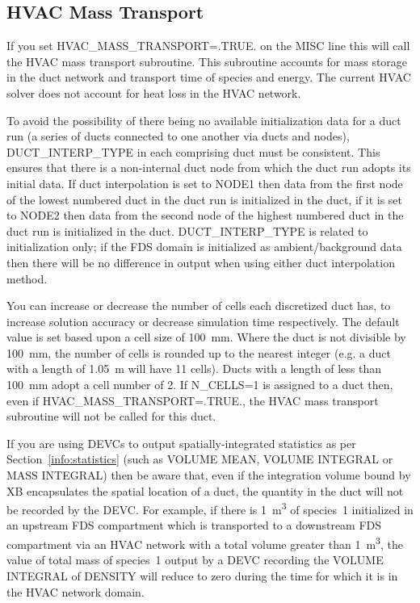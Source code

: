 \documentclass[11pt]{book}
\begin{document}
\subsection{HVAC Mass Transport}
\label{info:hvacmasstransport}

If you set {\ct HVAC\_MASS\_TRANSPORT=.TRUE.} on the {\ct MISC} line this will call the HVAC mass transport subroutine. This subroutine accounts for mass storage in the duct network and transport time of species and energy. The current HVAC solver does not account for heat loss in the HVAC network.

To avoid the possibility of there being no available initialization data for a duct run (a series of ducts connected to one another via ducts and nodes), {\ct DUCT\_INTERP\_TYPE} in each comprising duct must be consistent. This ensures that there is a non-internal duct node from which the duct run adopts its initial data. If duct interpolation is set to {\ct NODE1} then data from the first node of the lowest numbered duct in the duct run is initialized in the duct, if it is set to {\ct NODE2} then data from the second node of the highest numbered duct in the duct run is initialized in the duct. {\ct DUCT\_INTERP\_TYPE} is related to initialization only; if the FDS domain is initialized as ambient/background data then there will be no difference in output when using either duct interpolation method.

You can increase or decrease the number of cells each discretized duct has, to increase solution accuracy or decrease simulation time respectively. The default value is set based upon a cell size of \SI{100}{\milli\meter}. Where the duct is not divisible by \SI{100}{\milli\meter}, the number of cells is rounded up to the nearest integer (e.g. a duct with a length of \SI{1.05}{\meter} will have \num{11} cells). Ducts with a length of less than \SI{100}{\milli\meter} adopt a cell number of 2. If {\ct N\_CELLS=1} is assigned to a duct then, even if {\ct HVAC\_MASS\_TRANSPORT=.TRUE.}, the HVAC mass transport subroutine will not be called for this duct.

If you are using {\ct DEVC}s to output spatially-integrated statistics as per Section~\ref{info:statistics} (such as {\ct VOLUME MEAN}, {\ct VOLUME INTEGRAL} or {\ct MASS INTEGRAL}) then be aware that, even if the integration volume bound by {\ct XB} encapsulates the spatial location of a duct, the quantity in the duct will not be recorded by the {\ct DEVC}. For example, if there is \SI{1}{\meter\cubed} of species~\num{1} initialized in an upstream FDS compartment which is transported to a downstream FDS compartment via an HVAC network with a total volume greater than \SI{1}{\meter\cubed}, the value of total mass of species~\num{1} output by a {\ct DEVC} recording the {\ct VOLUME INTEGRAL} of {\ct DENSITY} will reduce to zero during the time for which it is in the HVAC network domain.
\end{document}
